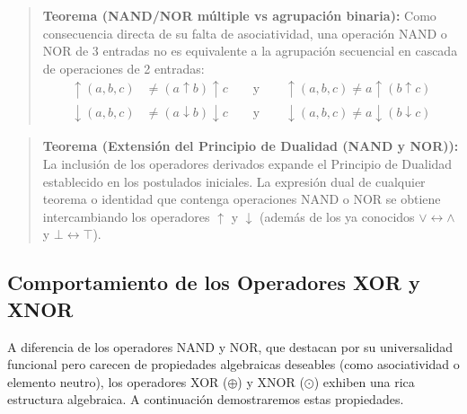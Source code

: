\begin{quote}\textbf{Teorema (NAND/NOR múltiple vs agrupación binaria):}\label{multiple_vs_binaria}
Como consecuencia directa de su falta de asociatividad, una operación NAND o NOR de 3 entradas no es equivalente a la agrupación secuencial en cascada de operaciones de 2 entradas:
\begin{align*}
    \uparrow(a,b,c) &\neq (a \uparrow b) \uparrow c \qquad \text{y} \qquad \uparrow(a,b,c) \neq a \uparrow (b \uparrow c) \\
    \downarrow(a,b,c) &\neq (a \downarrow b) \downarrow c \qquad \text{y} \qquad \downarrow(a,b,c) \neq a \downarrow (b \downarrow c)
\end{align*}
\end{quote}

\begin{quote}\textbf{Teorema (Extensión del Principio de Dualidad (NAND y NOR)):}\label{dualidad_nand_nor}
La inclusión de los operadores derivados expande el Principio de Dualidad establecido en los postulados iniciales. La expresión dual de cualquier teorema o identidad que contenga operaciones NAND o NOR se obtiene intercambiando los operadores $\uparrow$ y $\downarrow$ (además de los ya conocidos $\vee \leftrightarrow \wedge$ y $\bot \leftrightarrow \top$).
\end{quote}
\subsection{Comportamiento de los Operadores XOR y XNOR}
A diferencia de los operadores NAND y NOR, que destacan por su universalidad funcional pero carecen de propiedades algebraicas deseables (como asociatividad o elemento neutro), los operadores XOR ($\oplus$) y XNOR ($\odot$) exhiben una rica estructura algebraica. A continuación demostraremos estas propiedades.


